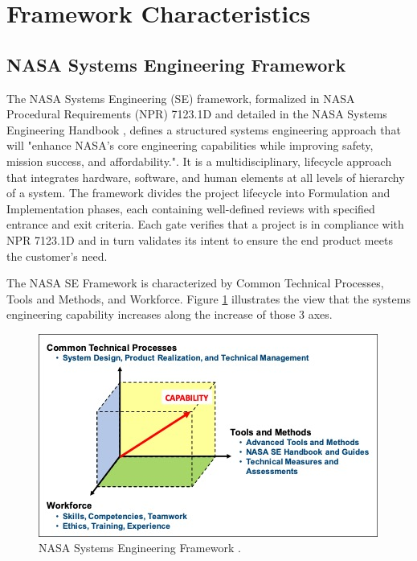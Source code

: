 \section{Framework Characteristics}
\label{sect:characteristics}
\subsection{NASA Systems Engineering Framework}
\label{sub:nasa}
The NASA Systems Engineering (SE) framework, formalized in NASA Procedural Requirements (NPR) 7123.1D \cite{npr7123.1D} and detailed in the NASA Systems Engineering Handbook \cite{nasa2016handbook}, defines a structured systems engineering approach that will "enhance NASA's core engineering capabilities while improving safety, mission success, and affordability."\cite{npr7123.1D}. 
It is a multidisciplinary, lifecycle approach that integrates hardware, software, and human elements at all levels of hierarchy of a system. 
The framework divides the project lifecycle into Formulation and Implementation phases, each containing well-defined reviews with specified entrance and exit criteria. 
Each gate verifies that a project is in compliance with NPR 7123.1D and in turn validates its intent to ensure the end product meets the customer's need\cite{npr7123.1D}.

The NASA SE Framework is characterized by Common Technical Processes, Tools and Methods, and Workforce. Figure \ref{fig:nasa_se_framework} illustrates the view that the systems engineering capability increases along the increase of those 3 axes. \\
\begin{figure}[h!]
  \centering
  \includegraphics[width=0.7\linewidth]{figures/NPR7123.1DC1F4.jpg}
  \caption{NASA Systems Engineering Framework
  \cite{npr7123.1D}.}
  \label{fig:nasa_se_framework}
\end{figure}

